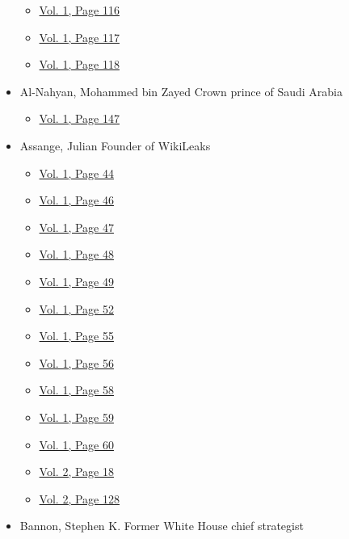 \begin{itemize}
  \begin{itemize}
  \tightlist
  \item
    \protect\hyperlink{g-page-124}{Vol. 1, Page 116}
  \item
    \protect\hyperlink{g-page-125}{Vol. 1, Page 117}
  \item
    \protect\hyperlink{g-page-126}{Vol. 1, Page 118}
  \end{itemize}
\item
  Al-Nahyan, Mohammed bin Zayed Crown prince of Saudi Arabia

  \begin{itemize}
  \tightlist
  \item
    \protect\hyperlink{g-page-155}{Vol. 1, Page 147}
  \end{itemize}
\item
  Assange, Julian Founder of WikiLeaks

  \begin{itemize}
  \tightlist
  \item
    \protect\hyperlink{g-page-52}{Vol. 1, Page 44}
  \item
    \protect\hyperlink{g-page-54}{Vol. 1, Page 46}
  \item
    \protect\hyperlink{g-page-55}{Vol. 1, Page 47}
  \item
    \protect\hyperlink{g-page-56}{Vol. 1, Page 48}
  \item
    \protect\hyperlink{g-page-57}{Vol. 1, Page 49}
  \item
    \protect\hyperlink{g-page-60}{Vol. 1, Page 52}
  \item
    \protect\hyperlink{g-page-63}{Vol. 1, Page 55}
  \item
    \protect\hyperlink{g-page-64}{Vol. 1, Page 56}
  \item
    \protect\hyperlink{g-page-66}{Vol. 1, Page 58}
  \item
    \protect\hyperlink{g-page-67}{Vol. 1, Page 59}
  \item
    \protect\hyperlink{g-page-68}{Vol. 1, Page 60}
  \item
    \protect\hyperlink{g-page-230}{Vol. 2, Page 18}
  \item
    \protect\hyperlink{g-page-340}{Vol. 2, Page 128}
  \end{itemize}
\item
  Bannon, Stephen K. Former White House chief strategist


\end{itemize}
